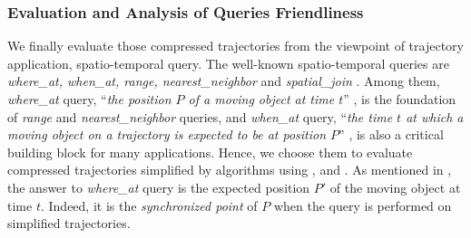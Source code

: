 {\subsubsection{{Evaluation and {Analysis} of Queries Friendliness}}
\label{sec-exp-query}
We finally evaluate those compressed trajectories from the viewpoint of trajectory application, \ie spatio-temporal query. The well-known spatio-temporal queries are \emph{where\_at, when\_at, range, nearest\_neighbor} and \emph{spatial\_join} \cite{Cao:Spatio,Trajcevski:Uncertainty}. Among them, \emph{where\_at} query, \ie ``\emph{the position $P$ of a moving object at time $t$}'' \cite{Cao:Spatio}, is the foundation of \emph{range} and \emph{nearest\_neighbor} queries, {and \emph{when\_at} query, \ie ``\emph{the time $t$ at which a moving object on a trajectory is expected to be at position $P$}'' \cite{Cao:Spatio}, is also a critical building block for many applications.}
{Hence, we choose them to evaluate compressed trajectories simplified by \lsa algorithms using \ped, \sed and \dad.
As mentioned in \cite{Cao:Spatio,Trajcevski:Uncertainty}, the answer to \emph{where\_at} query is the expected position $P'$ of the moving object at time $t$. Indeed, it is the \emph{synchronized point} of $P$ when the query is performed on simplified trajectories.}



}
